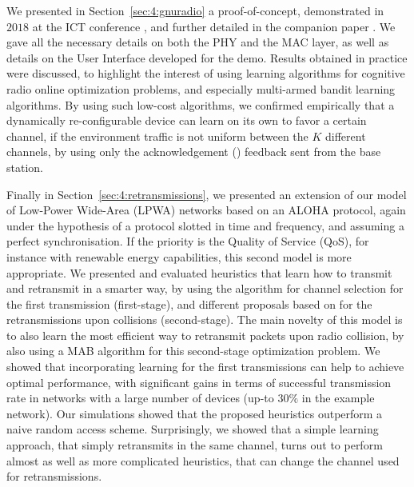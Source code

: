 We presented in Section~\ref{sec:4:gnuradio} a proof-of-concept, demonstrated in $2018$ at the ICT conference \cite{Besson2018ICT}, and further detailed in the companion paper \cite{Besson2019WCNC}.
We gave all the necessary details on both the PHY and the MAC layer, as well as details on the User Interface developed for the demo.
Results obtained in practice were discussed, to highlight the interest of using learning algorithms for cognitive radio online optimization problems, and especially multi-armed bandit learning algorithms.
%
By using such low-cost algorithms, we confirmed empirically that a dynamically re-configurable device can learn on its own to favor a certain channel, if the environment traffic is not uniform between the $K$ different channels, by using only the acknowledgement (\Ack) feedback sent from the base station.


Finally in Section~\ref{sec:4:retransmissions}, we presented an extension of our model of Low-Power Wide-Area (LPWA) networks based on an ALOHA protocol, again under the hypothesis of a protocol slotted in time and frequency, and assuming a perfect synchronisation.
If the priority is the Quality of Service (QoS), for instance with renewable energy capabilities, this second model is more appropriate.
We presented and evaluated heuristics that learn how to transmit and retransmit in a smarter way, by using the \UCB{} algorithm for channel selection for the first transmission (first-stage), and different proposals based on \UCB{} for the retransmissions upon collisions (second-stage).
The main novelty of this model is to also learn the most efficient way to retransmit packets upon radio collision, by also using a MAB algorithm for this second-stage optimization problem.
%
We showed that incorporating learning for the first transmissions can help to achieve optimal performance, with significant gains in terms of successful transmission rate in networks with a large number of devices (up-to $30\%$ in the example network).
Our simulations showed that the proposed heuristics outperform a naive random access scheme.
Surprisingly, we showed that a simple \UCB{} learning approach, that simply retransmits in the same channel, turns out to perform almost as well as more complicated heuristics, that can change the channel used for retransmissions.


